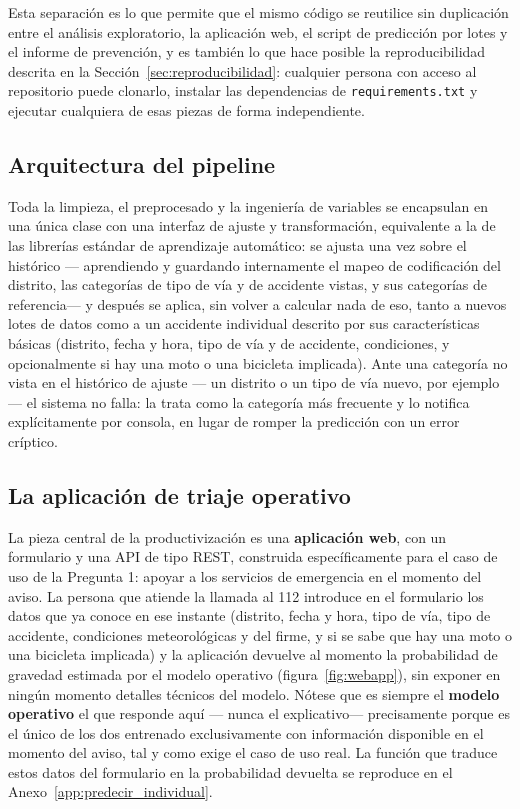 \documentclass[11pt,a4paper]{article}
\begin{document}
Esta separación es lo que permite que el mismo código se reutilice sin duplicación entre el análisis exploratorio, la aplicación web, el script de predicción por lotes y el informe de prevención, y es también lo que hace posible la reproducibilidad descrita en la Sección~\ref{sec:reproducibilidad}: cualquier persona con acceso al repositorio puede clonarlo, instalar las dependencias de \texttt{requirements.txt} y ejecutar cualquiera de esas piezas de forma independiente.

\subsection{Arquitectura del pipeline}

Toda la limpieza, el preprocesado y la ingeniería de variables se encapsulan en una única clase con una interfaz de ajuste y transformación, equivalente a la de las librerías estándar de aprendizaje automático: se ajusta una vez sobre el histórico --- aprendiendo y guardando internamente el mapeo de codificación del distrito, las categorías de tipo de vía y de accidente vistas, y sus categorías de referencia--- y después se aplica, sin volver a calcular nada de eso, tanto a nuevos lotes de datos como a un accidente individual descrito por sus características básicas (distrito, fecha y hora, tipo de vía y de accidente, condiciones, y opcionalmente si hay una moto o una bicicleta implicada). Ante una categoría no vista en el histórico de ajuste --- un distrito o un tipo de vía nuevo, por ejemplo--- el sistema no falla: la trata como la categoría más frecuente y lo notifica explícitamente por consola, en lugar de romper la predicción con un error críptico.

\subsection{La aplicación de triaje operativo}

La pieza central de la productivización es una \textbf{aplicación web}, con un formulario y una API de tipo REST, construida específicamente para el caso de uso de la Pregunta 1: apoyar a los servicios de emergencia en el momento del aviso. La persona que atiende la llamada al 112 introduce en el formulario los datos que ya conoce en ese instante (distrito, fecha y hora, tipo de vía, tipo de accidente, condiciones meteorológicas y del firme, y si se sabe que hay una moto o una bicicleta implicada) y la aplicación devuelve al momento la probabilidad de gravedad estimada por el modelo operativo (figura~\ref{fig:webapp}), sin exponer en ningún momento detalles técnicos del modelo. Nótese que es siempre el \textbf{modelo operativo} el que responde aquí --- nunca el explicativo--- precisamente porque es el único de los dos entrenado exclusivamente con información disponible en el momento del aviso, tal y como exige el caso de uso real. La función que traduce estos datos del formulario en la probabilidad devuelta se reproduce en el Anexo~\ref{app:predecir_individual}.
\end{document}
